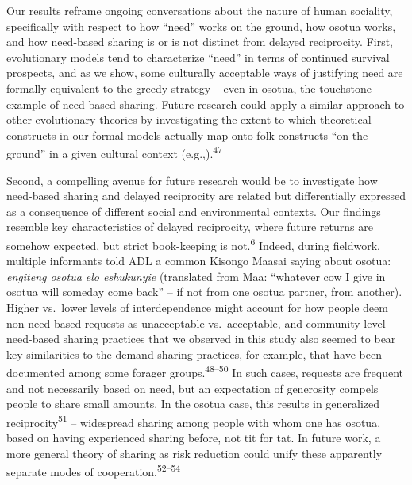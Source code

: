 \documentclass[
]{article}
\begin{document}
Our results reframe ongoing conversations about the nature of human sociality, specifically with respect to how ``need'' works on the ground, how osotua works, and how need-based sharing is or is not distinct from delayed reciprocity. First, evolutionary models tend to characterize ``need'' in terms of continued survival prospects, and as we show, some culturally acceptable ways of justifying need are formally equivalent to the greedy strategy -- even in osotua, the touchstone example of need-based sharing. Future research could apply a similar approach to other evolutionary theories by investigating the extent to which theoretical constructs in our formal models actually map onto folk constructs ``on the ground'' in a given cultural context (e.g.,).\textsuperscript{47}

Second, a compelling avenue for future research would be to investigate how need-based sharing and delayed reciprocity are related but differentially expressed as a consequence of different social and environmental contexts. Our findings resemble key characteristics of delayed reciprocity, where future returns are somehow expected, but strict book-keeping is not.\textsuperscript{6} Indeed, during fieldwork, multiple informants told ADL a common Kisongo Maasai saying about osotua: \emph{engiteng osotua elo eshukunyie} (translated from Maa: ``whatever cow I give in osotua will someday come back'' -- if not from one osotua partner, from another). Higher vs.~lower levels of interdependence might account for how people deem non-need-based requests as unacceptable vs.~acceptable, and community-level need-based sharing practices that we observed in this study also seemed to bear key similarities to the demand sharing practices, for example, that have been documented among some forager groups.\textsuperscript{48--50} In such cases, requests are frequent and not necessarily based on need, but an expectation of generosity compels people to share small amounts. In the osotua case, this results in generalized reciprocity\textsuperscript{51} -- widespread sharing among people with whom one has osotua, based on having experienced sharing before, not tit for tat. In future work, a more general theory of sharing as risk reduction could unify these apparently separate modes of cooperation.\textsuperscript{52--54}
\end{document}
